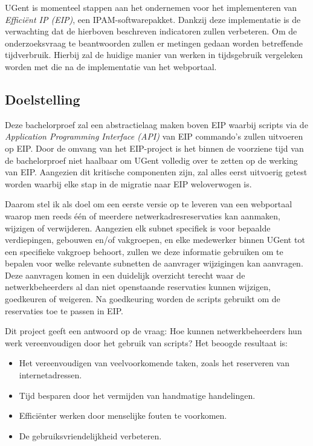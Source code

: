 UGent is momenteel stappen aan het ondernemen voor het implementeren van \textit{Efficiënt IP (EIP)}, een IPAM-softwarepakket. Dankzij deze implementatie is de verwachting dat de hierboven beschreven indicatoren zullen verbeteren. Om de onderzoeksvraag te beantwoorden zullen er metingen gedaan worden betreffende tijdverbruik. Hierbij zal de huidige manier van werken in tijdsgebruik vergeleken worden met die na de implementatie van het webportaal.

\subsection{Doelstelling}
\label{sec:doelstelling}
Deze bachelorproef zal een abstractielaag maken boven EIP waarbij scripts via de \textit{Application Programming Interface (API)} van EIP commando's zullen uitvoeren op EIP.
Door de omvang van het EIP-project is het binnen de voorziene tijd van de bachelorproef niet haalbaar om UGent volledig over te zetten op de werking van EIP. Aangezien dit kritische componenten zijn, zal alles eerst uitvoerig getest worden waarbij elke stap in de migratie naar EIP weloverwogen is.

Daarom stel ik als doel om een eerste versie op te leveren van een webportaal waarop men reeds één of meerdere netwerkadresreservaties kan aanmaken, wijzigen of verwijderen. Aangezien elk subnet specifiek is voor bepaalde verdiepingen, gebouwen en/of vakgroepen, en elke medewerker binnen UGent tot een specifieke vakgroep behoort, zullen we deze informatie gebruiken om te bepalen voor welke relevante subnetten de aanvrager wijzigingen kan aanvragen. Deze aanvragen komen in een duidelijk overzicht terecht waar de netwerkbeheerders al dan niet openstaande reservaties kunnen wijzigen, goedkeuren of weigeren. Na goedkeuring worden de scripts gebruikt om de reservaties toe te passen in EIP.

Dit project geeft een antwoord op de vraag: Hoe kunnen netwerkbeheerders hun werk vereenvoudigen door het gebruik van scripts?
Het beoogde resultaat is:
\begin{itemize}
    \item Het vereenvoudigen van veelvoorkomende taken, zoals het reserveren van internetadressen.
    \item Tijd besparen door het vermijden van handmatige handelingen.
    \item Efficiënter werken door menselijke fouten te voorkomen.
    \item De gebruiksvriendelijkheid verbeteren.
\end{itemize}

